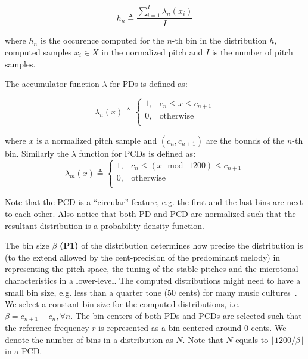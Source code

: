 \documentclass{sig-alternate}
\begin{document}
\begin{equation}
	h_n  \triangleq \frac{\sum_{i=1}^I \lambda_n\left(x_i\right)}{I}
	\label{eqn:histogram}
\end{equation}

\noindent
where $h_{n}$ is the occurence computed for the $n$-th bin in the distribution $h$, computed samples $x_i \in X$ in the normalized pitch and $I$ is the number of pitch samples.

The accumulator function $\lambda$ for PDs is defined as:

\begin{equation}
\lambda_{n}(x) \triangleq
\begin{cases}
1, & c_{n} \leq x \leq  c_{n+1} \\
0, & \text{otherwise} \\
\end{cases}
\end{equation}

\noindent
where $x$ is a normalized pitch sample and $(c_{n}, c_{n+1})$ are the bounds of the $n$-th bin. 
Similarly the $\lambda$ function for PCDs is defined as:
\begin{equation}
\lambda_{m}(x)  \triangleq
\begin{cases}
1, & c_{n} \leq \left(x\,\bmod\,1200\right) \leq  c_{n+1} \\
0, & \text{otherwise} \\
\end{cases}
\end{equation}

Note that the PCD is a ``circular'' feature, e.g. the first and the last bins are next to each other. Also notice that both PD and PCD are normalized such that the resultant distribution is a probability density function. 

The bin size $\beta$ {\bf (P1)} of the distribution determines how precise the distribution is (to the extend allowed by the cent-precision of the predominant melody) in representing the pitch space, the tuning of the stable pitches and the microtonal characteristics in a lower-level. The computed distributions might need to have a small bin size, e.g. less than a quarter tone ($50$ cents) for many music cultures~\cite{bozkurt_makam, chordia}. We select a constant bin size for the computed distributions, i.e. $\beta = c_{n+1} - c_{n},  \forall n$. The bin centers of both PDs and PCDs are selected such that the reference frequency $r$ is represented as a bin centered around $0$ cents. We denote the number of bins in a distribution as $N$. Note that $N$ equals to $\lfloor1200 / \beta\rfloor$ in a PCD.
\end{document}
